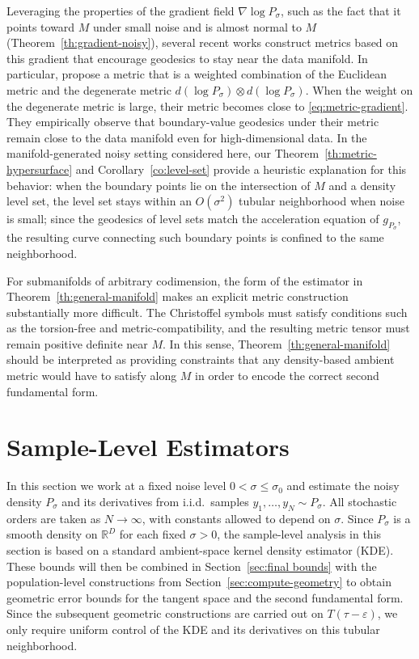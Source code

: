 \documentclass[11pt]{article}
\theoremstyle{plain}
\theoremstyle{definition}
\begin{document}
Leveraging the properties of the gradient field $\nabla\log P_\sigma$, such as the fact that it points toward $M$ under small noise and is almost normal to $M$ (Theorem~\ref{th:gradient-noisy}), several recent works construct metrics based on this gradient that encourage geodesics to stay near the data manifold. In particular, \citet{Azeglio2025WhatsIY} propose a metric that is a weighted combination of the Euclidean metric and the degenerate metric $d(\log P_\sigma)\otimes d(\log P_\sigma)$. When the weight on the degenerate metric is large, their metric becomes close to \eqref{eq:metric-gradient}. They empirically observe that boundary-value geodesics under their metric remain close to the data manifold even for high-dimensional data. In the manifold-generated noisy setting considered here, our Theorem~\ref{th:metric-hypersurface} and Corollary~\ref{co:level-set} provide a heuristic explanation for this behavior: when the boundary points lie on the intersection of $M$ and a density level set, the level set stays within an $O(\sigma^2)$ tubular neighborhood when noise is small; since the geodesics of level sets match the acceleration equation of $g_{P_\sigma}$, the resulting curve connecting such boundary points is confined to the same neighborhood.

For submanifolds of arbitrary codimension, the form of the estimator in Theorem~\ref{th:general-manifold} makes an explicit metric construction substantially more difficult.
The Christoffel symbols must satisfy conditions such as the torsion-free and metric-compatibility, and the resulting metric tensor must remain positive definite near $M$. In this sense, Theorem~\ref{th:general-manifold} should be interpreted as providing constraints that any density-based ambient metric would have to satisfy along $M$ in order to encode the correct second fundamental form. 

\section{Sample-Level Estimators}\label{sec:sample-level-estimator}
In this section we work at a fixed noise level $0<\sigma\le\sigma_0$ and estimate the noisy density $P_\sigma$ and its derivatives from i.i.d.\ samples $y_1,\dots,y_N\sim P_\sigma$. All stochastic orders are taken as $N\to\infty$, with constants allowed to depend on $\sigma$. Since $P_\sigma$ is a smooth density on $\mathbb R^D$ for each fixed $\sigma>0$, the sample-level analysis in this section is based on a standard ambient-space kernel density estimator (KDE). These bounds will then be combined in Section~\ref{sec:final bounds} with the population-level constructions from Section~\ref{sec:compute-geometry} to obtain geometric error bounds for the tangent space and the second fundamental form. Since the subsequent geometric constructions are carried out on $T(\tau-\varepsilon)$, we only require uniform control of the KDE and its derivatives on this tubular neighborhood.
\end{document}
